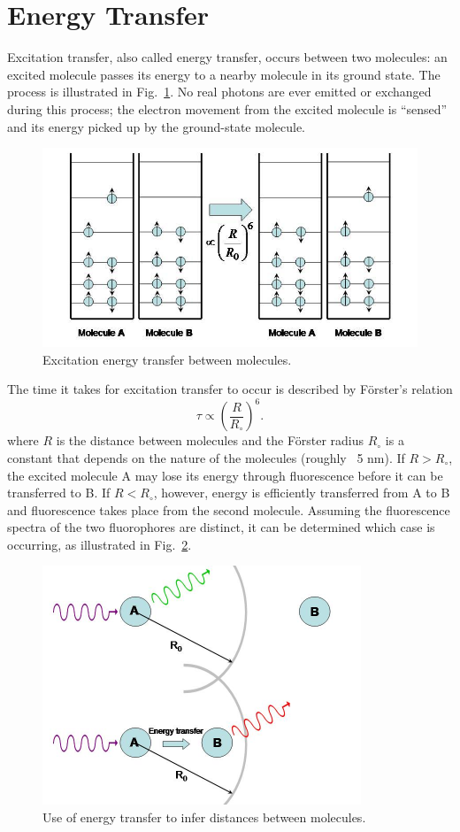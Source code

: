 \section{Energy Transfer}

Excitation transfer, also called energy transfer, occurs between two molecules: an excited molecule passes its energy to a nearby molecule in its ground state.  The process is illustrated in Fig.~\ref{Fig7-7}. No real photons are ever emitted or exchanged during this process; the electron movement from the excited molecule is ``sensed'' and its energy picked up by the ground-state molecule.  
\begin{figure}[h]
	\centering
	\includegraphics[width=4.5in]{./figures/Topic7/Fig7-7.jpg}
	\caption{Excitation energy transfer between molecules.}
	\label{Fig7-7}
\end{figure}  

The time it takes for excitation transfer to occur is described by F{\"o}rster's relation
$$\tau\propto\left(\frac{R}{R_{\circ}}\right)^6.$$
where $R$ is the distance between molecules and the F{\"o}rster radius $R_{\circ}$ is a constant that depends on the nature of the molecules (roughly ~5 nm).  If $R > R_{\circ}$, the excited molecule A may lose its energy through fluorescence before it can be transferred to B.  If $R < R_{\circ}$, however, energy is efficiently transferred from A to B and fluorescence takes place from the second molecule.  Assuming the fluorescence spectra of the two fluorophores are distinct, it can be determined which case is occurring, as illustrated in Fig.~\ref{Fig7-8}.
\begin{figure}[h]
	\centering
	\includegraphics[width=3.75in]{./figures/Topic7/Fig7-8.jpg}
	\caption{Use of energy transfer to infer distances between molecules.}
	\label{Fig7-8}
\end{figure}

